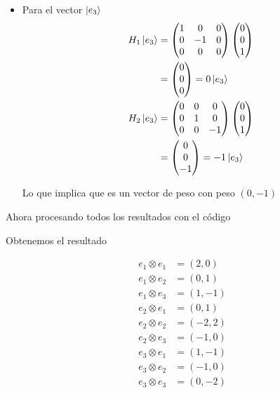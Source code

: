 \documentclass[12pt]{amsart}
\begin{document}
\begin{itemize}
  \item Para el vector $\ket{e_3}$
    \begin{align*}
      H_1 \ket{e_3} &=
      \begin{pmatrix}
        1 &  0 & 0 \\
        0 & -1 & 0 \\
        0 &  0 & 0
      \end{pmatrix} 
      \begin{pmatrix}
        0 \\ 0 \\ 1
      \end{pmatrix}\\
      &= \begin{pmatrix}
        0 \\ 0 \\ 0
      \end{pmatrix} = 0 \ket{e_3}\\
      H_2 \ket{e_3} &=
      \begin{pmatrix}
        0 &  0 & 0 \\
        0 &  1 & 0 \\
        0 &  0 & -1
      \end{pmatrix} 
      \begin{pmatrix}
        0 \\ 0 \\ 1
      \end{pmatrix}\\
      &= \begin{pmatrix}
        0 \\ 0 \\ -1
      \end{pmatrix} = -1\ket{e_3}\\
    \end{align*}

    Lo que implica que es un vector de peso con peso $(0, -1)$
\end{itemize}

Ahora procesando todos los resultados con el código



Obtenemos el resultado

\begin{align*}
  e_1 \otimes e_1 &= (2, 0)\\
  e_1 \otimes e_2 &= (0, 1)\\
  e_1 \otimes e_3 &= (1, -1)\\
  e_2 \otimes e_1 &= (0, 1)\\
  e_2 \otimes e_2 &= (-2, 2)\\
  e_2 \otimes e_3 &= (-1, 0)\\
  e_3 \otimes e_1 &= (1, -1)\\
  e_3 \otimes e_2 &= (-1, 0)\\
  e_3 \otimes e_3 &= (0, -2)\\
\end{align*}
\end{document}
